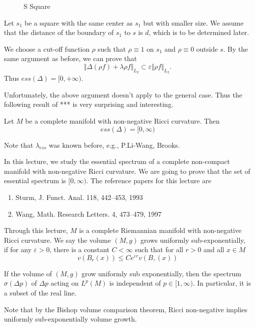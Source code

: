 \begin{figure}[h!]
\vspace{0.2in}
\caption{S Square}
\end{figure}

\vspace{0.5in}

 Let $ s _1 $ be a square with the same center as $ s_1$ but with smaller size. We assume that the distance of the boundary of $s_1$ to $s$ is $d$, which is to be determined later.

We choose a cut-off function $\rho$ such that $ \rho\equiv 1$ on $ s_1 $ and $ \rho \equiv 0$ outside $s$. By the same argument as before,  we can prove that 
%
\[\Vert \Delta ( \rho f ) + \lambda \rho f \Vert _{L_{2}} \subset \varepsilon \Vert \rho  f \Vert_{L_{2}}.\]
%
Thus $ ess (\Delta ) = [ 0 , + \infty)$.

Unfortunately, the above argument doesn't apply to the general case. Thus the following result of ***
is very surprising and interesting. 

\begin{theorem}[J-P. Wang] Let $M$ be a complete manifold with non-negative Ricci curvature. Then 
%
\[ ess (\Delta ) = [ 0, \infty) \]
\end{theorem}
Note that $ \lambda _{ess} $ was known before, e.g., P.Li-Wang, Brooks.


In this lecture, we study the essential spectrum of a complete non-compact manifold with non-negative Ricci curvature. We are going to prove that the set of essential spectrum is $ [ 0 , \infty)$. The reference papers for this lecture are

\begin{enumerate}
  \item Sturm, J. Funct. Anal. 118, 442--453, 1993
  \item Wang, Math. Research Letters. 4, 473--479, 1997
 \end{enumerate}

Through this lecture, $M$ is a complete Riemannian manifold with non-negative Ricci curvature. We say the volume $ (M, g)$ grows uniformly sub-exponentially, if for any $ \varepsilon > 0 $, there is a constant $ C < \infty$ such that for all $ r > 0 $ and all $ x \in M $ 
%
\[ v (B_r (x)) \leq C e ^{\varepsilon r} v (B, (x))\]

\begin{theorem}If the volume of $ (M, g) $ grow uniformly sub exponentially, then the spectrum $ \sigma (\Delta p ) $ of $ \Delta p $ acting on $ L^p (M) $ is independent of $ p \in [1, \infty) $. In particular, it is a subset of the real line.

Note that by the Bishop volume comparison theorem, Ricci non-negative implies uniformly sub-exponentially volume growth.
\end{theorem}

